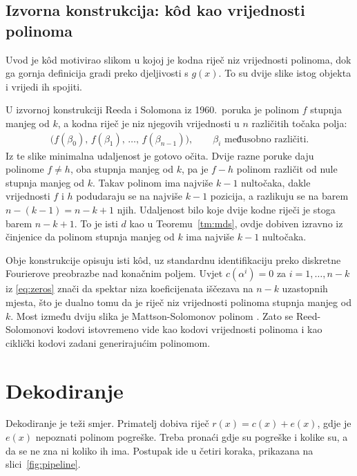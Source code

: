 \documentclass{mathos}
\begin{document}
\section{Izvorna konstrukcija: kôd kao vrijednosti polinoma}\label{eval}

Uvod je kôd motivirao slikom u kojoj je kodna riječ niz vrijednosti polinoma, dok ga gornja definicija gradi preko djeljivosti s $g(x)$. To su dvije slike istog objekta i vrijedi ih spojiti.

U izvornoj konstrukciji Reeda i Solomona iz 1960.\ poruka je polinom $f$ stupnja manjeg od $k$, a kodna riječ je niz njegovih vrijednosti u $n$ različitih točaka polja:
\begin{align*}
    \big(f(\beta_0),\, f(\beta_1),\, \dots,\, f(\beta_{n-1})\big), \qquad \beta_i \text{ međusobno različiti}.
\end{align*}
Iz te slike minimalna udaljenost je gotovo očita. Dvije razne poruke daju polinome $f \ne h$, oba stupnja manjeg od $k$, pa je $f - h$ polinom različit od nule stupnja manjeg od $k$. Takav polinom ima najviše $k-1$ nultočaka, dakle vrijednosti $f$ i $h$ podudaraju se na najviše $k-1$ pozicija, a razlikuju se na barem $n - (k-1) = n-k+1$ njih. Udaljenost bilo koje dvije kodne riječi je stoga barem $n-k+1$. To je isti $d$ kao u Teoremu~\ref{tm:mds}, ovdje dobiven izravno iz činjenice da polinom stupnja manjeg od $k$ ima najviše $k-1$ nultočaka.

Obje konstrukcije opisuju isti kôd, uz standardnu identifikaciju preko diskretne Fourierove preobrazbe nad konačnim poljem. Uvjet $c(\alpha^i)=0$ za $i=1,\dots,n-k$ iz \eqref{eq:zeros} znači da spektar niza koeficijenata iščezava na $n-k$ uzastopnih mjesta, što je dualno tomu da je riječ niz vrijednosti polinoma stupnja manjeg od $k$. Most između dviju slika je Mattson-Solomonov polinom \cite[pogl.\ 10]{macwilliams}. Zato se Reed-Solomonovi kodovi istovremeno vide kao kodovi vrijednosti polinoma i kao ciklički kodovi zadani generirajućim polinomom.


\chapter{Dekodiranje}\label{dekodiranje}

Dekodiranje je teži smjer. Primatelj dobiva riječ $r(x) = c(x) + e(x)$, gdje je $e(x)$ nepoznati polinom pogreške. Treba pronaći gdje su pogreške i kolike su, a da se ne zna ni koliko ih ima. Postupak ide u četiri koraka, prikazana na slici~\ref{fig:pipeline}.
\end{document}
